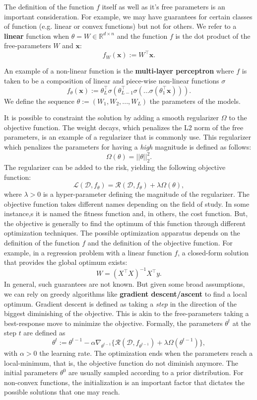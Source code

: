 The definition of the function $f$ itself as well as it's free parameters is an important consideration. For example, we may have guarantees for certain classes of function (e.g. linear or convex functions) but not for others. We refer to a \textbf{linear} function when $\theta=W\in\mathbb{R}^{d\times n}$ and the function $f$ is the dot product of the free-parameters $W$ and $\bm x$: 
\[f_W(\bm x):= W^\top\bm x.\]

An example of a non-linear function is the \textbf{multi-layer perceptron} where $f$ is taken to be a composition of linear and piece-wise non-linear functions $\sigma$
\[
f_\theta(\bm x) := \theta_L^\top\sigma(\theta_{L-1}^\top\sigma(...\sigma(\theta_1^\top\bm x))).
\]
We define the sequence $\theta:=(W_1, W_2,..., W_L)$ the parameters of the models.

It is possible to constraint the solution by adding a smooth regularizer $\Omega$ to the objective function. The weight decays, which penalizes the L2 norm of the free parameters, is an example of a regularizer that is commonly use. This regularizer which penalizes the parameters for having a \textit{high} magnitude is defined as follows:
\begin{equation}
    \label{eqn-reg-learner}
    \Omega(\theta) = ||\theta||^2_2.
\end{equation}
The regularizer can be added to the risk, yielding the following objective function:
\begin{equation}
    \label{eqn-learner}
    \mathcal{L}(\mathcal{D}, f_\theta) = \mathcal{R}(\mathcal{D}, f_\theta) + \lambda\Omega(\theta),
\end{equation}
where $\lambda>0$ is a hyper-parameter defining the magnitude of the regularizer. The objective function takes different names depending on the field of study. In some instance,s it is named the fitness function and, in others, the cost function. But, the objective is generally to find the optimum of this function through different optimization techniques.   
The possible optimization apparatus depends on the definition of the function $f$ and the definition of the objective function. For example, in a regression problem with a linear function $f$, a closed-form solution that provides the global optimum exists:
\[
W = (X^\top X)^{-1}X^\top y.
\]
In general, such guarantees are not known. But given some broad assumptions, we can rely on greedy algorithms like \textbf{gradient descent/ascent} to find a local optimum. Gradient descent is defined as taking a \textit{step} in the direction of the biggest diminishing of the objective. This is akin to the free-parameters taking a best-response move to minimize the objective. Formally, the parameters $\theta^t$ at the step $t$ are defined as
\[
\theta^t := \theta^{t-1} - \alpha\nabla_{\theta^{t-1}}\{\mathcal{R}(\mathcal{D}, f_{\theta^{t-1}}) + \lambda\Omega(\theta^{t-1})\},
\]
with $\alpha>0$ the learning rate. The optimization ends when the parameters reach a local-minimum, that is, the objective function do not diminish anymore. The initial parameters $\theta^0$ are usually sampled according to a prior distribution. For non-convex functions, the initialization is an important factor that dictates the possible solutions that one may reach. 

